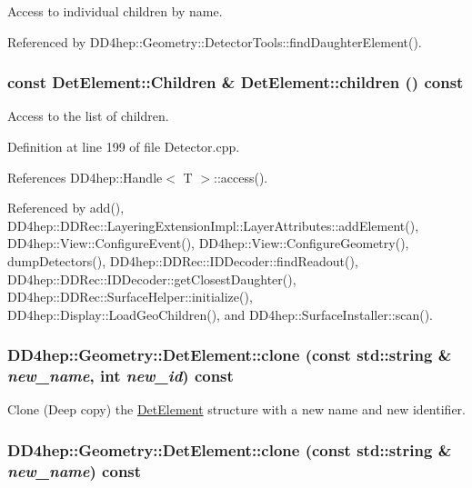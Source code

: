 Access to individual children by name. 

Referenced by DD4hep::Geometry::DetectorTools::findDaughterElement().\hypertarget{class_d_d4hep_1_1_geometry_1_1_det_element_a2c8a811c999fafb4021d5e342fbdee50}{
\subsubsection[{children}]{\setlength{\rightskip}{0pt plus 5cm}const {\bf DetElement::Children} \& DetElement::children () const}}
\label{class_d_d4hep_1_1_geometry_1_1_det_element_a2c8a811c999fafb4021d5e342fbdee50}


Access to the list of children. 

Definition at line 199 of file Detector.cpp.

References DD4hep::Handle$<$ T $>$::access().

Referenced by add(), DD4hep::DDRec::LayeringExtensionImpl::LayerAttributes::addElement(), DD4hep::View::ConfigureEvent(), DD4hep::View::ConfigureGeometry(), dumpDetectors(), DD4hep::DDRec::IDDecoder::findReadout(), DD4hep::DDRec::IDDecoder::getClosestDaughter(), DD4hep::DDRec::SurfaceHelper::initialize(), DD4hep::Display::LoadGeoChildren(), and DD4hep::SurfaceInstaller::scan().\hypertarget{class_d_d4hep_1_1_geometry_1_1_det_element_a9e21f6b6f70dd9898d41141a83689c8b}{
\subsubsection[{clone}]{ DD4hep::Geometry::DetElement::clone (const std::string \& {\em new\_\-name}, \/  int {\em new\_\-id}) const}}
\label{class_d_d4hep_1_1_geometry_1_1_det_element_a9e21f6b6f70dd9898d41141a83689c8b}


Clone (Deep copy) the \hyperlink{class_d_d4hep_1_1_geometry_1_1_det_element}{DetElement} structure with a new name and new identifier. \hypertarget{class_d_d4hep_1_1_geometry_1_1_det_element_a60dd867e5753b97a8d6df6c96846b11f}{
\subsubsection[{clone}]{ DD4hep::Geometry::DetElement::clone (const std::string \& {\em new\_\-name}) const}}
\label{class_d_d4hep_1_1_geometry_1_1_det_element_a60dd867e5753b97a8d6df6c96846b11f}



